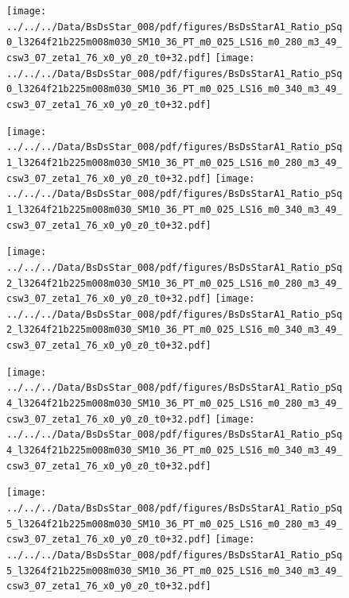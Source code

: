 \documentclass[a4paper,10pt]{article}
\begin{document}
\begin{figure}[p]
 \texttt{[image: ../../../Data/BsDsStar\_008/pdf/figures/BsDsStarA1\_Ratio\_pSq0\_l3264f21b225m008m030\_SM10\_36\_PT\_m0\_025\_LS16\_m0\_280\_m3\_49\_csw3\_07\_zeta1\_76\_x0\_y0\_z0\_t0+32.pdf]} 
 \texttt{[image: ../../../Data/BsDsStar\_008/pdf/figures/BsDsStarA1\_Ratio\_pSq0\_l3264f21b225m008m030\_SM10\_36\_PT\_m0\_025\_LS16\_m0\_340\_m3\_49\_csw3\_07\_zeta1\_76\_x0\_y0\_z0\_t0+32.pdf]} 
 \end{figure}
\begin{figure}[p]
 \texttt{[image: ../../../Data/BsDsStar\_008/pdf/figures/BsDsStarA1\_Ratio\_pSq1\_l3264f21b225m008m030\_SM10\_36\_PT\_m0\_025\_LS16\_m0\_280\_m3\_49\_csw3\_07\_zeta1\_76\_x0\_y0\_z0\_t0+32.pdf]} 
 \texttt{[image: ../../../Data/BsDsStar\_008/pdf/figures/BsDsStarA1\_Ratio\_pSq1\_l3264f21b225m008m030\_SM10\_36\_PT\_m0\_025\_LS16\_m0\_340\_m3\_49\_csw3\_07\_zeta1\_76\_x0\_y0\_z0\_t0+32.pdf]} 
 \end{figure}
\begin{figure}[p]
 \texttt{[image: ../../../Data/BsDsStar\_008/pdf/figures/BsDsStarA1\_Ratio\_pSq2\_l3264f21b225m008m030\_SM10\_36\_PT\_m0\_025\_LS16\_m0\_280\_m3\_49\_csw3\_07\_zeta1\_76\_x0\_y0\_z0\_t0+32.pdf]} 
 \texttt{[image: ../../../Data/BsDsStar\_008/pdf/figures/BsDsStarA1\_Ratio\_pSq2\_l3264f21b225m008m030\_SM10\_36\_PT\_m0\_025\_LS16\_m0\_340\_m3\_49\_csw3\_07\_zeta1\_76\_x0\_y0\_z0\_t0+32.pdf]} 
 \end{figure}
\clearpage
\begin{figure}[p]
 \texttt{[image: ../../../Data/BsDsStar\_008/pdf/figures/BsDsStarA1\_Ratio\_pSq4\_l3264f21b225m008m030\_SM10\_36\_PT\_m0\_025\_LS16\_m0\_280\_m3\_49\_csw3\_07\_zeta1\_76\_x0\_y0\_z0\_t0+32.pdf]} 
 \texttt{[image: ../../../Data/BsDsStar\_008/pdf/figures/BsDsStarA1\_Ratio\_pSq4\_l3264f21b225m008m030\_SM10\_36\_PT\_m0\_025\_LS16\_m0\_340\_m3\_49\_csw3\_07\_zeta1\_76\_x0\_y0\_z0\_t0+32.pdf]} 
 \end{figure}
\begin{figure}[p]
 \texttt{[image: ../../../Data/BsDsStar\_008/pdf/figures/BsDsStarA1\_Ratio\_pSq5\_l3264f21b225m008m030\_SM10\_36\_PT\_m0\_025\_LS16\_m0\_280\_m3\_49\_csw3\_07\_zeta1\_76\_x0\_y0\_z0\_t0+32.pdf]} 
 \texttt{[image: ../../../Data/BsDsStar\_008/pdf/figures/BsDsStarA1\_Ratio\_pSq5\_l3264f21b225m008m030\_SM10\_36\_PT\_m0\_025\_LS16\_m0\_340\_m3\_49\_csw3\_07\_zeta1\_76\_x0\_y0\_z0\_t0+32.pdf]} 
 \end{figure}
\clearpage
\end{document}

